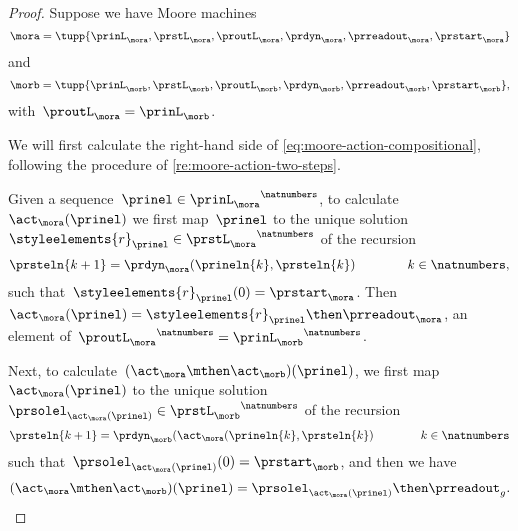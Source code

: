 \begin{proof}
    Suppose we have Moore machines
    \begin{equation*}
        \mora = \tupp{\prinL_{\mora},\prstL_{\mora},\proutL_{\mora},\prdyn_{\mora},\prreadout_{\mora},\prstart_{\mora}}
    \end{equation*}
    and
    \begin{equation*}
        \morb = \tupp{\prinL_{\morb},\prstL_{\morb},\proutL_{\morb},\prdyn_{\morb},\prreadout_{\morb},\prstart_{\morb}},
    \end{equation*}
    with~$\proutL_\mora = \prinL_\morb$.

    We will first calculate the right-hand side of \cref{eq:moore-action-compositional}, following the procedure of \cref{re:moore-action-two-steps}.

    Given a sequence~$\prinel \in {\prinL_{\mora}}^\natnumbers$, to calculate~$\act_\mora(\prinel)$ we first map~$\prinel$ to the unique solution~$\styleelements{r}_\prinel \in {\prstL_{\mora}}^\natnumbers$ of the recursion
    \begin{equation*}
        \prsteln{k+1} = \prdyn_\mora(\prineln{k}, \prsteln{k})  \qquad \qquad k \in \natnumbers,
    \end{equation*}
    such that~$\styleelements{r}_\prinel(0) = \prstart_{\mora}$.
    Then~$\act_\mora(\prinel) = \styleelements{r}_\prinel \then \prreadout_\mora$, an element of~${\proutL_{\mora}}^\natnumbers = {\prinL_{\morb}}^\natnumbers$.

    Next, to calculate~$(\act_\mora \mthen \act_\morb)(\prinel)$, we first map~$\act_\mora(\prinel)$ to the unique solution~$\prsolel_{\act_\mora(\prinel)} \in {\prstL_{\morb}}^\natnumbers$ of the recursion
    \begin{equation*}
        \prsteln{k+1} = \prdyn_\morb(\act_\mora(\prineln{k}, \prsteln{k})  \qquad \qquad k \in \natnumbers
    \end{equation*}
    such that~$\prsolel_{\act_\mora(\prinel)}(0) = \prstart_{\morb}$, and then we have
    \begin{equation}
        \label{eq:Moore-act-composition-1}
        (\act_\mora \mthen \act_\morb)(\prinel) = \prsolel_{\act_\mora(\prinel)} \then \prreadout_g.
    \end{equation}


\end{proof}
